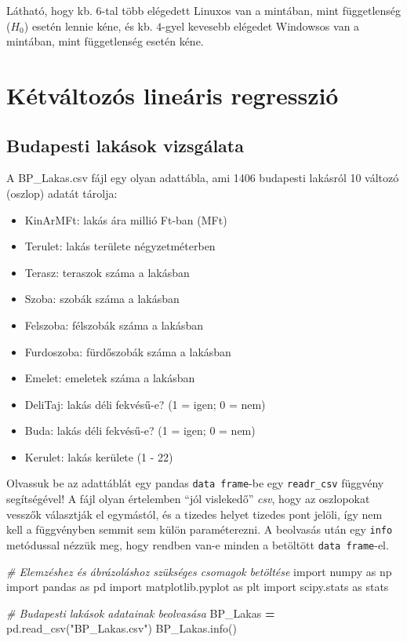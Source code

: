 \documentclass[
]{book}
\newenvironment{Shaded}{\begin{snugshade}}{\end{snugshade}}
\newcommand{\CommentTok}[1]{\textcolor[rgb]{0.56,0.35,0.01}{\textit{#1}}}
\newcommand{\ImportTok}[1]{#1}
\newcommand{\NormalTok}[1]{#1}
\newcommand{\OperatorTok}[1]{\textcolor[rgb]{0.81,0.36,0.00}{\textbf{#1}}}
\newcommand{\StringTok}[1]{\textcolor[rgb]{0.31,0.60,0.02}{#1}}
\providecommand{\tightlist}{%
  \setlength{\itemsep}{0pt}\setlength{\parskip}{0pt}}
\begin{document}
Látható, hogy kb. \(6\)-tal több elégedett Linuxos van a mintában, mint függetlenség (\(H_0\)) esetén lennie kéne, és kb. \(4\)-gyel kevesebb elégedet Windowsos van a mintában, mint függetlenség esetén kéne.

\chapter{Kétváltozós lineáris regresszió}\label{kuxe9tvuxe1ltozuxf3s-lineuxe1ris-regressziuxf3}

\section{Budapesti lakások vizsgálata}\label{budapesti-lakuxe1sok-vizsguxe1lata}

A BP\_Lakas.csv fájl egy olyan adattábla, ami 1406 budapesti lakásról 10 változó (oszlop) adatát tárolja:

\begin{itemize}
\tightlist
\item
  KinArMFt: lakás ára millió Ft-ban (MFt)
\item
  Terulet: lakás területe négyzetméterben
\item
  Terasz: teraszok száma a lakásban
\item
  Szoba: szobák száma a lakásban
\item
  Felszoba: félszobák száma a lakásban
\item
  Furdoszoba: fürdőszobák száma a lakásban
\item
  Emelet: emeletek száma a lakásban
\item
  DeliTaj: lakás déli fekvésű-e? (1 = igen; 0 = nem)
\item
  Buda: lakás déli fekvésű-e? (1 = igen; 0 = nem)
\item
  Kerulet: lakás kerülete (1 - 22)
\end{itemize}

Olvassuk be az adattáblát egy pandas \texttt{data\ frame}-be egy \texttt{readr\_csv} függvény segítségével! A fájl olyan értelemben ``jól vislekedő'' \emph{csv}, hogy az oszlopokat vesszők választják el egymástól, és a tizedes helyet tizedes pont jelöli, így nem kell a függvényben semmit sem külön paraméterezni. A beolvasás után egy \texttt{info} metódussal nézzük meg, hogy rendben van-e minden a betöltött \texttt{data\ frame}-el.

\begin{Shaded}
\begin{Highlighting}[]
\CommentTok{\# Elemzéshez és ábrázoláshoz szükséges csomagok betöltése}
\ImportTok{import}\NormalTok{ numpy }\ImportTok{as}\NormalTok{ np}
\ImportTok{import}\NormalTok{ pandas }\ImportTok{as}\NormalTok{ pd}
\ImportTok{import}\NormalTok{ matplotlib.pyplot }\ImportTok{as}\NormalTok{ plt}
\ImportTok{import}\NormalTok{ scipy.stats }\ImportTok{as}\NormalTok{ stats}

\CommentTok{\# Budapesti lakások adatainak beolvasása}
\NormalTok{BP\_Lakas }\OperatorTok{=}\NormalTok{ pd.read\_csv(}\StringTok{"BP\_Lakas.csv"}\NormalTok{)}
\NormalTok{BP\_Lakas.info()}
\end{Highlighting}
\end{Shaded}
\end{document}
